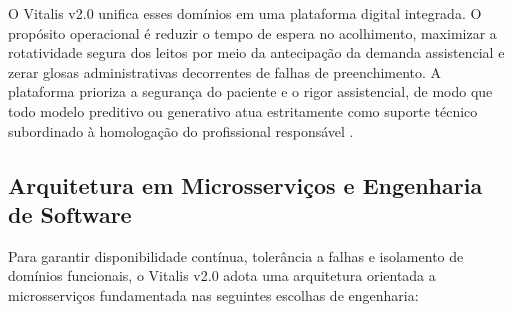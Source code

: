 O Vitalis v2.0 unifica esses domínios em uma plataforma digital integrada. O propósito operacional é reduzir o tempo de espera no acolhimento, maximizar a rotatividade segura dos leitos por meio da antecipação da demanda assistencial e zerar glosas administrativas decorrentes de falhas de preenchimento. A plataforma prioriza a segurança do paciente e o rigor assistencial, de modo que todo modelo preditivo ou generativo atua estritamente como suporte técnico subordinado à homologação do profissional responsável \cite{topol:2019}.

\subsection{Arquitetura em Microsserviços e Engenharia de Software}
\label{subsec:arquitetura_software}

Para garantir disponibilidade contínua, tolerância a falhas e isolamento de domínios funcionais, o Vitalis v2.0 adota uma arquitetura orientada a microsserviços fundamentada nas seguintes escolhas de engenharia:

